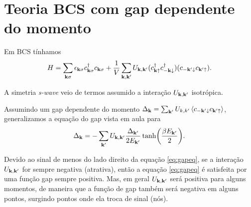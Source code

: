 \documentclass[a4paper,11pt]{article}
\begin{document}
\section{Teoria BCS com gap dependente do momento}

Em BCS tínhamos
$$
H = \sum_{\vb{k}\sigma} \epsilon_{\vb{k}\sigma} c_{\vb{k}\sigma}^\dagger c_{\vb{k}\sigma} +
\frac{1}{V} \sum_{\vb{k},\vb{k}'} U_{\vb{k},\vb{k}'} (c_{\vb{k}\uparrow}^\dagger c_{-\vb{k}\downarrow}^\dagger) (c_{-\vb{k}'\downarrow} c_{\vb{k}'\uparrow}).
$$

A simetria \textit{s-wave} veio de termos assumido a interação $U_{\vb{k},\vb{k}'}$ isotrópica.

Assumindo um gap dependente do momento $\Delta_{\k} = \sum_{\k'} U_{k, k'} \ev{c_{-\k'\down}c_{\k'\up}}$, generalizamos a equação do gap vista em aula para
\begin{equation} \label{eq:gapeq}
\Delta_{\vb{k}} = - \sum_{\vb{k}'} U_{\vb{k},\vb{k}'} \frac{\Delta_{\vb{k}'}}{2 E_{\vb{k}'}} \tanh(\frac{\beta E_{\vb{k}'}}{2}).
\end{equation}

Devido ao sinal de menos do lado direito da equação \ref{eq:gapeq}, se a interação $U_{\vb{k},\vb{k}'}$ for sempre negativa (atrativa), então a equação \ref{eq:gapeq} é satisfeita por uma função gap sempre positiva. Mas, em geral $U_{\vb{k},\vb{k}'}$ será positiva para alguns momentos, de maneira que a função de gap também será negativa em alguns pontos, surgindo pontos onde ela troca de sinal (nós).
\end{document}
